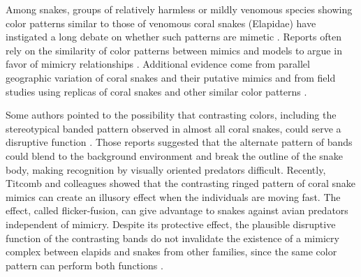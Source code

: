 Among snakes, groups of relatively harmless or mildly venomous species showing color patterns similar to those of venomous coral snakes (Elapidae) have instigated a long debate on whether such patterns are mimetic \citep[see a comprehensive review in][]{pough_1988}. Reports often rely on the similarity of color patterns between mimics and models to argue in favor of mimicry relationships \citep{dunn_coral_1954, hecht_coral_1956, greene_coral_1981, savage_1992}. Additional evidence come from parallel geographic variation of coral snakes and their putative mimics \citep[e. g.,][]{hecht_coral_1956, zweifel_1960, greene_coral_1981, marques_1991, rabosky_coral_2016} and from field studies using replicas of coral snakes and other similar color patterns \citep{smith_1975, brodie_differential_1993, brodie_experimental_1995, hinman_predation_1997, pfennig_2001, buasso_predation_2006}.

Some authors pointed to the possibility that contrasting colors, including the stereotypical banded pattern observed in almost all coral snakes, could serve a disruptive function \citep{gadow_1908, thayer_1909, dunn_coral_1954, brattstrom_coral_1955}. Those reports suggested that the alternate pattern of bands could blend to the background environment and break the outline of the snake body, making recognition by visually oriented predators difficult. Recently, Titcomb and colleagues \citeyear{titcomb_2014} showed that the contrasting ringed pattern of coral snake mimics can create an illusory effect when the individuals are moving fast. The effect, called flicker-fusion, can give advantage to snakes against avian predators independent of mimicry. Despite its protective effect, the plausible disruptive function of the contrasting bands do not invalidate the existence of a mimicry complex between elapids and snakes from other families, since the same color pattern can perform both functions \citep{titcomb_2014}.


